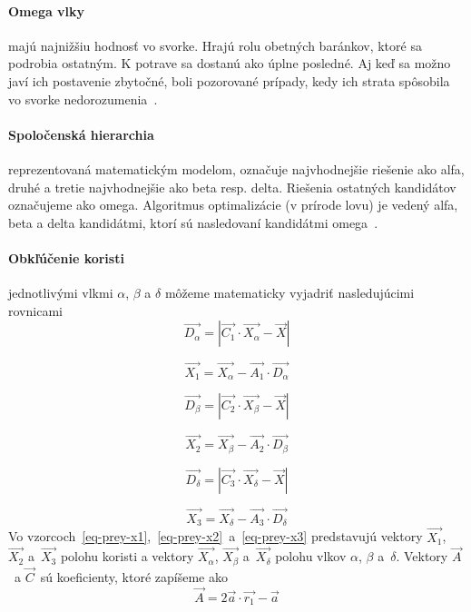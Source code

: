 \documentclass[a4paper,slovak,12pt,appendix]{article}
\begin{document}
\paragraph{Omega vlky} majú najnižšiu hodnosť vo svorke. Hrajú rolu obetných
baránkov, ktoré sa podrobia ostatným. K potrave sa dostanú ako úplne posledné.
Aj keď sa možno javí ich postavenie zbytočné, boli pozorované prípady, kedy ich
strata spôsobila vo svorke nedorozumenia~\cite{Seeley1991}.

\paragraph{Spoločenská hierarchia} reprezentovaná matematickým modelom,
označuje najvhodnejšie riešenie ako alfa, druhé a tretie najvhodnejšie ako beta
resp. delta. Riešenia ostatných kandidátov označujeme ako omega. Algoritmus
optimalizácie (v prírode lovu) je vedený alfa, beta a delta kandidátmi, ktorí
sú nasledovaní kandidátmi omega~\cite{Seeley1991}.

\paragraph{Obkľúčenie koristi} jednotlivými vlkmi $\alpha$, $\beta$ a $\delta$
môžeme matematicky vyjadriť nasledujúcimi rovnicami
\begin{equation}
  \vec{D_\alpha} = | \vec{C_1} \cdot \vec{X_\alpha} - \vec{X} |
  \label{eq-prey-alpha}
\end{equation}

\begin{equation}
  \vec{X_1} = \vec{X_\alpha} - \vec{A_1} \cdot \vec{D_\alpha}
  \label{eq-prey-x1}
\end{equation}

\begin{equation}
  \vec{D_\beta} = | \vec{C_2} \cdot \vec{X_\beta} - \vec{X} |
  \label{eq-prey-beta}
\end{equation}

\begin{equation}
  \vec{X_2} = \vec{X_\beta} - \vec{A_2} \cdot \vec{D_\beta}
  \label{eq-prey-x2}
\end{equation}

\begin{equation}
  \vec{D_\delta} = | \vec{C_3} \cdot \vec{X_\delta} - \vec{X} |
  \label{eq-prey-delta}
\end{equation}

\begin{equation}
  \vec{X_3} = \vec{X_\delta} - \vec{A_3} \cdot \vec{D_\delta}
  \label{eq-prey-x3}
\end{equation}
Vo vzorcoch~\ref{eq-prey-x1},~\ref{eq-prey-x2}~a~\ref{eq-prey-x3} predstavujú
vektory $\vec{X_1}$, $\vec{X_2}$ a $\vec{X_3}$ polohu koristi a vektory
$\vec{X_\alpha}$, $\vec{X_\beta}$ a $\vec{X_\delta}$ polohu vlkov
$\alpha$, $\beta$ a $\delta$. Vektory $\vec{A}$ a $\vec{C}$ sú koeficienty,
ktoré zapíšeme ako
\begin{equation}
  \vec{A} = 2\vec{a} \cdot \vec{r_1} - \vec{a}
  \label{eq-prey-a}
\end{equation}
\end{document}
